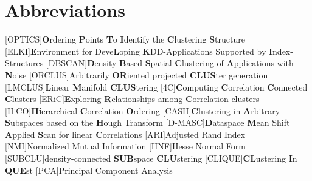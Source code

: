 \chapter*{Abbreviations}
\begin{acronym}
    [OPTICS]{\textbf{O}rdering \textbf{P}oints \textbf{T}o \textbf{I}dentify the \textbf{C}lustering \textbf{S}tructure}
    [ELKI]{\textbf{E}nvironment for Deve\textbf{L}oping \textbf{K}DD-Applications Supported by \textbf{I}ndex-Structures}
    [DBSCAN]{\textbf{D}ensity-\textbf{B}ased \textbf{S}patial \textbf{C}lustering of \textbf{A}pplications with \textbf{N}oise}
    [ORCLUS]{Arbitrarily \textbf{OR}iented projected \textbf{CLUS}ter generation}
    [LMCLUS]{\textbf{L}inear \textbf{M}anifold \textbf{CLUS}tering}
    [4C]{\textbf{C}omputing \textbf{C}orrelation \textbf{C}onnected \textbf{C}lusters}
    [ERiC]{\textbf{E}xploring \textbf{R}elationships among \textbf{C}orrelation clusters}
    [HiCO]{\textbf{Hi}erarchical \textbf{C}orrelation \textbf{O}rdering}
    [CASH]{\textbf{C}lustering in \textbf{A}rbitrary \textbf{S}ubspaces based on the \textbf{H}ough Transform}
    [D-MASC]{\textbf{D}ataspace \textbf{M}ean Shift \textbf{A}pplied \textbf{S}can for linear \textbf{C}orrelations}
    [ARI]{Adjusted Rand Index}
    [NMI]{Normalized Mutual Information}
    [HNF]{Hesse Normal Form}
    [SUBCLU]{density-connected \textbf{SUB}space \textbf{CLU}stering}
    [CLIQUE]{\textbf{CL}ustering \textbf{I}n \textbf{QUE}st}
    [PCA]{Principal Component Analysis}
\end{acronym}